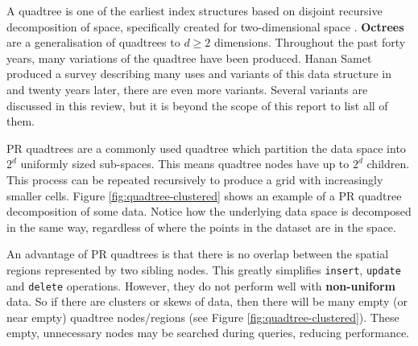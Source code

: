 A quadtree is one of the earliest index structures based on disjoint recursive decomposition of space, specifically created for two-dimensional space \cite{original-quadtree}. \textbf{Octrees} are a generalisation of quadtrees to $d \geq 2$ dimensions. Throughout the past forty years, many variations of the quadtree have been produced. Hanan Samet produced a survey describing many uses and variants of this data structure in  \cite{quadtree} and twenty years later, there are even more variants. Several variants are discussed in this review, but it is beyond the scope of this report to list all of them.

PR quadtrees are a commonly used quadtree which partition the data space into $2^d$ uniformly sized sub-spaces. This means quadtree nodes have up to $2^d$ children. This process can be repeated recursively to produce a grid with increasingly smaller cells. Figure \ref{fig:quadtree-clustered} shows an example of a PR quadtree decomposition of some data. Notice how the underlying data space is decomposed in the same way, regardless of where the points in the dataset are in the space.

An advantage of PR quadtrees is that there is no overlap between the spatial regions represented by two sibling nodes. This greatly simplifies \texttt{insert}, \texttt{update} and \texttt{delete} operations. However, they do not perform well with \textbf{non-uniform} data. So if there are clusters or skews of data, then there will be many empty (or near empty) quadtree nodes/regions (see Figure \ref{fig:quadtree-clustered}). These empty, unnecessary nodes may be searched during queries, reducing performance.


